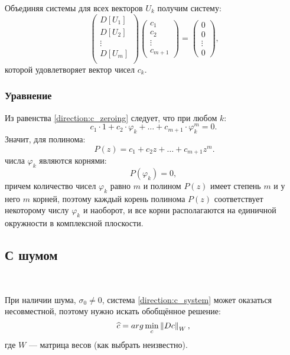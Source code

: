 Объединяя системы для всех векторов $U_k$ получим систему:
\begin{equation}~\label{direction:c_system}
    \begin{pmatrix}
        D[U_1] \\
        D[U_2] \\
        \vdots \\
        D[U_m] \\
    \end{pmatrix}
    \begin{pmatrix}
        c_1    \\
        c_2    \\
        \vdots \\
        c_{m+1}
    \end{pmatrix}
    =
    \begin{pmatrix}
        0      \\
        0      \\
        \vdots \\
        0
    \end{pmatrix} ,
\end{equation}
которой удовлетворяет вектор чисел $c_k$.

\subsubsection{Уравнение}

Из равенства \eqref{direction:c_zeroing} следует, что при любом $k$:
\[
    c_1 \cdot 1 + c_2 \cdot \varphi_k + \dots + c_{m+1} \cdot \varphi_k^{m} = 0 .
\]
Значит, для полинома:
\begin{equation}~\label{direction:c_polynomial}
    P(z) = c_1 + c_2 z + \dots + c_{m+1} z^m .
\end{equation}
числа $\varphi_k$ являются корнями:
\[
    P \left( \varphi_k \right) = 0 ,
\]
причем количество чисел $\varphi_k$ равно $m$ и полином $P(z)$ имеет степень $m$ и у него $m$ корней, поэтому каждый корень полинома $P(z)$
соответствует некоторому числу $\varphi_k$ и наоборот, и все корни располагаются на единичной окружности в комплексной плоскости.

\subsection{С шумом}~\label{direction:linear:estimation}

При наличии шума, $\sigma_0 \neq 0$, система \eqref{direction:c_system} может оказаться несовместной, поэтому нужно искать обобщённое решение:
\[
    \widehat{c} = arg \min_c \left \| D c \right \|_{W} ,
\]
где $W$ --- матрица весов (как выбрать неизвестно).

